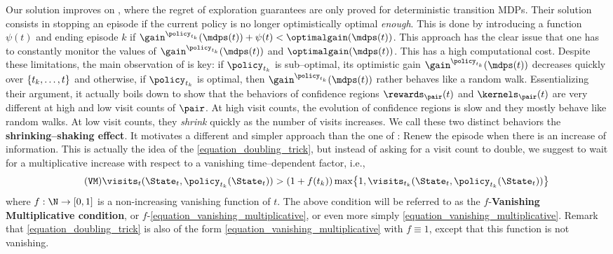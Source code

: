 \documentclass[preprint,cleveref,12pt]{colt2025}
\DeclarePairedDelimiter{\braces}{\{}{\}}	%
\def\models{\mdps}
\def\optgain{\optimalgain} %
\newcommand{\strong}[1]{\textbf{#1}}
\begin{document}
    Our solution improves on \cite{boone_regret_2023}, where the regret of exploration guarantees are only proved for deterministic transition MDPs. 
    Their solution consists in stopping an episode if the current policy is no longer optimistically optimal \emph{enough}. This is done by introducing a function $\psi(t)$ and ending episode $k$ if $\gain^{\policy_{t_k}}(\models(t)) + \psi(t) < \optgain(\models(t))$. 
    This approach has the clear issue that one has to constantly  monitor the values of $\gain^{\policy_{t_k}}(\models(t))$ and $\optgain(\models(t))$. This has a high computational  cost.
    Despite these limitations, the main observation of \cite{boone_regret_2023} is key:
    if $\policy_{t_k}$ is sub--optimal, its optimistic gain $\gain^{\policy_{t_k}}(\models(t))$ decreases quickly over $\braces{t_k, \ldots, t}$ and otherwise, if $\policy_{t_k}$ is optimal, then $\gain^{\policy_{t_k}}(\models(t))$ rather behaves like a random walk.
    Essentializing their argument, it actually boils down to show that the behaviors of confidence regions $\rewards_\pair(t)$ and $\kernels_\pair(t)$ are very different at high and low visit counts of $\pair$. 
    At high visit counts, the evolution of confidence regions is slow and they mostly behave like random walks.
    At low visit counts, they \emph{shrink} quickly as the number of visits increases. We call these two distinct behaviors the \strong{shrinking--shaking effect}.
    It motivates a different and simpler approach than the one of \cite{boone_regret_2023}: Renew the episode when there is an increase of information.
    This is actually the idea of the \eqref{equation_doubling_trick}, but instead of asking for a visit count to double, we suggest to wait for a multiplicative increase with respect to a vanishing time--dependent factor, i.e.,
    \begin{equation}
    \tag{\texttt{VM}}
    \label{equation_vanishing_multiplicative}
        \visits_t(\State_t, \policy_{t_k}(\State_t))
        > 
        (1 + f(t_k)) 
        \max\braces*{
            1,
            \visits_{t_k}(\State_t, \policy_{t_k}(\State_t))
        }
    \end{equation}
    \noindent
    where $f : \N \to [0,1]$ is a non-increasing vanishing function of $t$. 
    The above condition will be referred to as the $f$-\strong{Vanishing Multiplicative condition}, or $f$-\eqref{equation_vanishing_multiplicative}, or even more simply \eqref{equation_vanishing_multiplicative}.
    Remark that \eqref{equation_doubling_trick} is also of the form \eqref{equation_vanishing_multiplicative} with $f \equiv 1$, except that this function is not vanishing.
\end{document}
